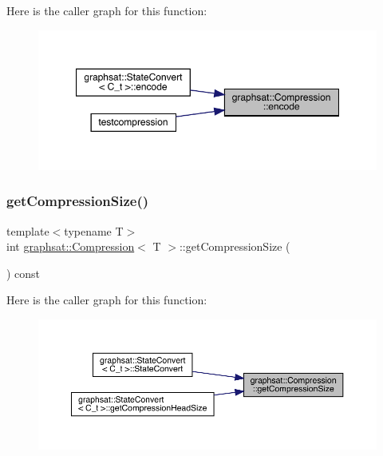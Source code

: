 Here is the caller graph for this function\+:
\nopagebreak
\begin{figure}[H]
\begin{center}
\leavevmode
\includegraphics[width=350pt]{classgraphsat_1_1_compression_acf45cee3c5c364552b6815f659687df9_icgraph}
\end{center}
\end{figure}
\mbox{\label{classgraphsat_1_1_compression_acac0787ecffc12d1608c8d39e59465f6}} 
\subsubsection{\texorpdfstring{getCompressionSize()}{getCompressionSize()}}
{\footnotesize\ttfamily template$<$typename T$>$ \\
int \mbox{\hyperlink{classgraphsat_1_1_compression}{graphsat\+::\+Compression}}$<$ T $>$\+::get\+Compression\+Size (\begin{DoxyParamCaption}{ }\end{DoxyParamCaption}) const\hspace{0.3cm}{\ttfamily [inline]}}

Here is the caller graph for this function\+:
\nopagebreak
\begin{figure}[H]
\begin{center}
\leavevmode
\includegraphics[width=350pt]{classgraphsat_1_1_compression_acac0787ecffc12d1608c8d39e59465f6_icgraph}
\end{center}
\end{figure}
\mbox{\label{classgraphsat_1_1_compression_aca0cf58115662df90a0ba2d7b8fc699b}} 
